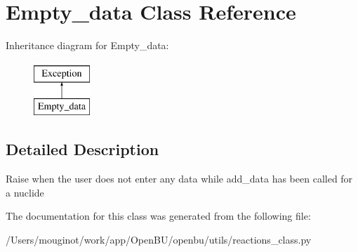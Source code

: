 \hypertarget{classopenbu_1_1utils_1_1reactions__class_1_1_empty__data}{}\section{Empty\+\_\+data Class Reference}
\label{classopenbu_1_1utils_1_1reactions__class_1_1_empty__data}
Inheritance diagram for Empty\+\_\+data\+:\begin{figure}[H]
\begin{center}
\leavevmode
\includegraphics[height=2.000000cm]{classopenbu_1_1utils_1_1reactions__class_1_1_empty__data}
\end{center}
\end{figure}


\subsection{Detailed Description}
\begin{DoxyVerb}Raise when the user does not enter any data while add_data has been called for a nuclide\end{DoxyVerb}
 

The documentation for this class was generated from the following file\+:\begin{DoxyCompactItemize}
\item 
/\+Users/mouginot/work/app/\+Open\+B\+U/openbu/utils/reactions\+\_\+class.\+py\end{DoxyCompactItemize}
